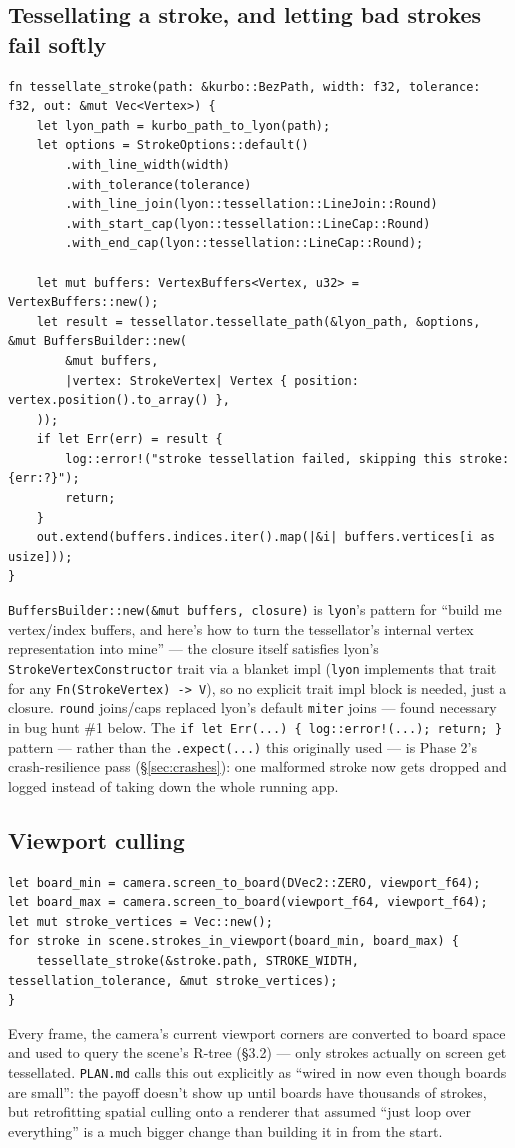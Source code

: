 \documentclass[11pt]{article}
\begin{document}
\subsection{Tessellating a stroke, and letting bad strokes fail softly}
\begin{lstlisting}
fn tessellate_stroke(path: &kurbo::BezPath, width: f32, tolerance: f32, out: &mut Vec<Vertex>) {
    let lyon_path = kurbo_path_to_lyon(path);
    let options = StrokeOptions::default()
        .with_line_width(width)
        .with_tolerance(tolerance)
        .with_line_join(lyon::tessellation::LineJoin::Round)
        .with_start_cap(lyon::tessellation::LineCap::Round)
        .with_end_cap(lyon::tessellation::LineCap::Round);

    let mut buffers: VertexBuffers<Vertex, u32> = VertexBuffers::new();
    let result = tessellator.tessellate_path(&lyon_path, &options, &mut BuffersBuilder::new(
        &mut buffers,
        |vertex: StrokeVertex| Vertex { position: vertex.position().to_array() },
    ));
    if let Err(err) = result {
        log::error!("stroke tessellation failed, skipping this stroke: {err:?}");
        return;
    }
    out.extend(buffers.indices.iter().map(|&i| buffers.vertices[i as usize]));
}
\end{lstlisting}
\texttt{BuffersBuilder::new(\&mut buffers, closure)} is \texttt{lyon}'s pattern for
``build me vertex/index buffers, and here's how to turn the tessellator's internal vertex
representation into mine'' — the closure itself satisfies lyon's
\texttt{StrokeVertexConstructor} trait via a blanket impl (\texttt{lyon} implements that
trait for any \texttt{Fn(StrokeVertex) -> V}), so no explicit trait impl block is needed,
just a closure. \texttt{round} joins/caps replaced lyon's default \texttt{miter} joins —
found necessary in bug hunt \#1 below. The \texttt{if let Err(...) \{ log::error!(...);
return; \}} pattern — rather than the \texttt{.expect(...)} this originally used — is
Phase 2's crash-resilience pass (\S\ref{sec:crashes}): one malformed stroke now gets
dropped and logged instead of taking down the whole running app.

\subsection{Viewport culling}
\label{sec:cull}
\begin{lstlisting}
let board_min = camera.screen_to_board(DVec2::ZERO, viewport_f64);
let board_max = camera.screen_to_board(viewport_f64, viewport_f64);
let mut stroke_vertices = Vec::new();
for stroke in scene.strokes_in_viewport(board_min, board_max) {
    tessellate_stroke(&stroke.path, STROKE_WIDTH, tessellation_tolerance, &mut stroke_vertices);
}
\end{lstlisting}
Every frame, the camera's current viewport corners are converted to board space and used
to query the scene's R-tree (\S3.2) — only strokes actually on screen get tessellated.
\texttt{PLAN.md} calls this out explicitly as ``wired in now even though boards are
small'': the payoff doesn't show up until boards have thousands of strokes, but retrofitting
spatial culling onto a renderer that assumed ``just loop over everything'' is a much bigger
change than building it in from the start.
\end{document}
